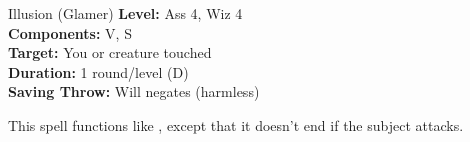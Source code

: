 {Illusion (Glamer)}
{
	\textbf{Level:}
	Ass 4, Wiz 4\\
	\textbf{Components:}
	V, S\\
	\textbf{Target:}
	You or creature touched\\
	\textbf{Duration:}
	1 round/level (D)\\
	\textbf{Saving Throw:}
	Will negates (harmless)\\
}
{
	This spell functions like , except that it doesn't end if the subject attacks.

}
